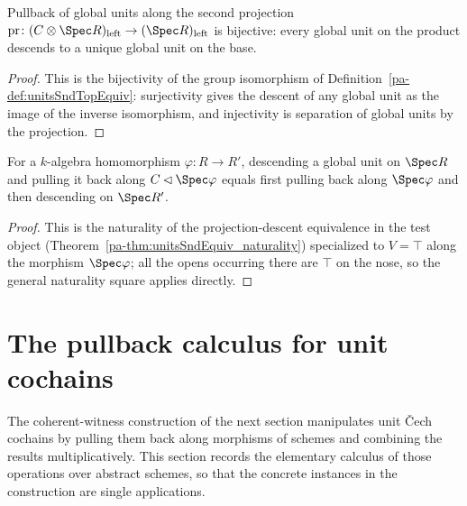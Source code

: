 \begin{theorem}
  \label{pa-thm:appTop_units_bijective}
  \leanok

  Pullback of global units along the second projection \(\mathrm{pr} \colon (C \otimes \Spec
  R)_{\mathrm{left}} \to (\Spec R)_{\mathrm{left}}\) is bijective: every global unit on the
  product descends to a unique global unit on the base.
\end{theorem}
\begin{proof}
  \leanok
  This is the bijectivity of the group isomorphism of
  Definition~\ref{pa-def:unitsSndTopEquiv}: surjectivity gives the descent of any global unit as
  the image of the inverse isomorphism, and injectivity is separation of global units by the
  projection.
\end{proof}

\begin{theorem}
  \label{pa-thm:unitsSndTopEquiv_naturality}
  \leanok

  For a \(k\)-algebra homomorphism \(\varphi \colon R \to R'\), descending a global unit on
  \(\Spec R\) and pulling it back along \(C \lhd \Spec\varphi\) equals first pulling back along
  \(\Spec\varphi\) and then descending on \(\Spec R'\).
\end{theorem}
\begin{proof}
  \leanok
  This is the naturality of the projection-descent equivalence in the test object
  (Theorem~\ref{pa-thm:unitsSndEquiv_naturality}) specialized to \(V = \top\) along the morphism
  \(\Spec\varphi\); all the opens occurring there are \(\top\) on the nose, so the general
  naturality square applies directly.
\end{proof}

\section{The pullback calculus for unit cochains}
\label{pa-sec:cochainPullback}

The coherent-witness construction of the next section manipulates unit \v Cech cochains by
pulling them back along morphisms of schemes and combining the results multiplicatively. This
section records the elementary calculus of those operations over abstract schemes, so that the
concrete instances in the construction are single applications.

